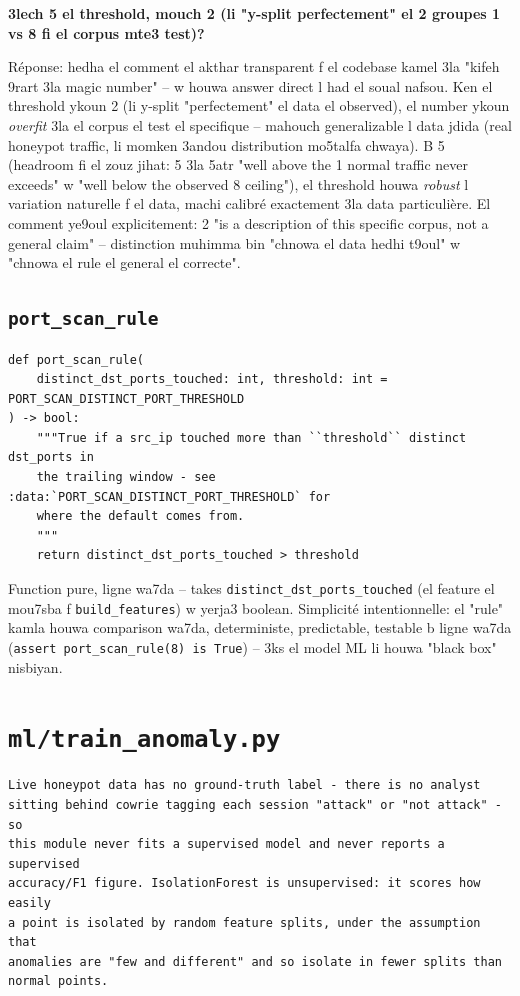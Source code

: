 \documentclass[11pt,a4paper]{report}
\DeclareRobustCommand{\code}[1]{\texttt{#1}}
\DeclareRobustCommand{\file}[1]{\texttt{\color{amber}#1}}
\begin{document}
\begin{soual}
\textbf{3lech 5 el threshold, mouch 2 (li "y-split perfectement" el 2
groupes 1 vs 8 fi el corpus mte3 test)?}

Réponse: hedha el comment el akthar transparent f el codebase kamel 3la
"kifeh 9rart 3la magic number" -- w houwa answer direct l had el soual
nafsou. Ken el threshold ykoun 2 (li y-split "perfectement" el data el
observed), el number ykoun \emph{overfit} 3la el corpus el test el
specifique -- mahouch generalizable l data jdida (real honeypot traffic,
li momken 3andou distribution mo5talfa chwaya). B 5 (headroom fi el zouz
jihat: 5 3la 5atr "well above the 1 normal traffic never exceeds" w "well
below the observed 8 ceiling"), el threshold houwa \emph{robust} l
variation naturelle f el data, machi calibré exactement 3la data
particulière. El comment ye9oul explicitement: 2 "is a description of
this specific corpus, not a general claim" -- distinction muhimma bin
"chnowa el data hedhi t9oul" w "chnowa el rule el general el correcte".
\end{soual}

\subsection{\code{port\_scan\_rule}}

\begin{lstlisting}[style=pystyle]
def port_scan_rule(
    distinct_dst_ports_touched: int, threshold: int = PORT_SCAN_DISTINCT_PORT_THRESHOLD
) -> bool:
    """True if a src_ip touched more than ``threshold`` distinct dst_ports in
    the trailing window - see :data:`PORT_SCAN_DISTINCT_PORT_THRESHOLD` for
    where the default comes from.
    """
    return distinct_dst_ports_touched > threshold
\end{lstlisting}

Function pure, ligne wa7da -- takes \code{distinct\_dst\_ports\_touched}
(el feature el mou7sba f \code{build\_features}) w yerja3 boolean. Simplicité
intentionnelle: el "rule" kamla houwa comparison wa7da, deterministe,
predictable, testable b ligne wa7da (\code{assert port\_scan\_rule(8) is
True}) -- 3ks el model ML li houwa "black box" nisbiyan.

\section{\file{ml/train\_anomaly.py}}

\begin{lstlisting}[style=pystyle]
Live honeypot data has no ground-truth label - there is no analyst
sitting behind cowrie tagging each session "attack" or "not attack" - so
this module never fits a supervised model and never reports a supervised
accuracy/F1 figure. IsolationForest is unsupervised: it scores how easily
a point is isolated by random feature splits, under the assumption that
anomalies are "few and different" and so isolate in fewer splits than
normal points.
\end{lstlisting}
\end{document}
